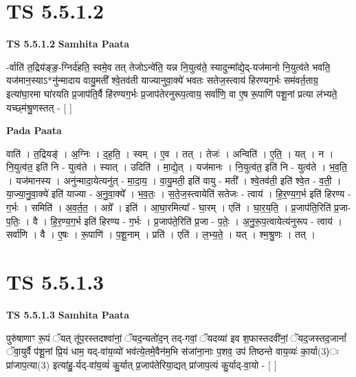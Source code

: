 \documentclass[17pt]{extarticle}
\begin{document}

\section{ TS 5.5.1.2 }

\textbf{TS 5.5.1.2 } \newline
\textbf{Samhita Paata} \newline

-र्वाति॑ त॒द्रिय॑ङ्ङ॒-ग्निर्द॑हति॒ स्वमे॒व तत् तेजोऽन्वे॑ति॒ यन्न नि॒युत्व॑ते॒ स्यादुन्मा᳚द्ये॒द्-यज॑मानो नि॒युत्व॑ते भवति॒ यज॑मान॒स्याऽ*नु॑न्मादाय वायु॒मती᳚ श्वे॒तव॑ती याज्यानुवा॒क्ये॑ भवतः सतेज॒स्त्वाय॑ हिरण्यग॒र्भः सम॑वर्त॒ताग्र॒ इत्या॑घा॒रमा घा॑रयति प्र॒जाप॑ति॒र्वै हि॑रण्यग॒र्भः प्र॒जाप॑तेरनुरूप॒त्वाय॒ सर्वा॑णि॒ वा ए॒ष रू॒पाणि॑ पशू॒नां प्रत्या ल॑भ्यते॒ यच्छ्म॑श्रु॒णस्तत् - [  ] \newline

\textbf{Pada Paata} \newline

वाति॑ । त॒द्रियङ्॑ । अ॒ग्निः । द॒ह॒ति॒ । स्वम् । ए॒व । तत् । तेजः॑ । अन्विति॑ । ए॒ति॒ । यत् । न । नि॒युत्व॑त॒ इति॑ नि - युत्व॑ते । स्यात् । उदिति॑ । मा॒द्ये॒त् । यज॑मानः । नि॒युत्व॑त॒ इति॑ नि - युत्व॑ते । भ॒व॒ति॒ । यज॑मानस्य । अनु॑न्मादा॒येत्यनु॑त् - मा॒दा॒य॒ । वा॒यु॒मती॒ इति॑ वायु - मती᳚ । श्वे॒तव॑ती॒ इति॑ श्वे॒त - व॒ती॒ । या॒ज्या॒नु॒वा॒क्ये॑ इति॑ याज्या - अ॒नु॒वा॒क्ये᳚ । भ॒व॒तः॒ । स॒ते॒ज॒स्त्वायेति॑ सतेजः - त्वाय॑ । हि॒र॒ण्य॒ग॒र्भ इति॑ हिरण्य - ग॒र्भः । समिति॑ । अ॒व॒र्त॒त॒ । अग्रे᳚ । इति॑ । आ॒घा॒रमित्या᳚ - घा॒रम् । एति॑ । घा॒र॒य॒ति॒ । प्र॒जाप॑ति॒रिति॑ प्र॒जा-प॒तिः॒ । वै । हि॒र॒ण्य॒ग॒र्भ इति॑ हिरण्य - ग॒र्भः । प्र॒जाप॑ते॒रिति॑ प्र॒जा - प॒तेः॒ । अ॒नु॒रू॒प॒त्वायेत्य॑नुरूप - त्वाय॑ । सर्वा॑णि । वै । ए॒षः । रू॒पाणि॑ । प॒शू॒नाम् । प्रति॑ । एति॑ । ल॒भ्य॒ते॒ । यत् । श्म॒श्रु॒णः । तत् ।  \newline





\section{ TS 5.5.1.3 }

\textbf{TS 5.5.1.3 } \newline
\textbf{Samhita Paata} \newline

पुरु॑षाणाꣳ रू॒पं ॅयत् तू॑प॒रस्तदश्वा॑नां॒ ॅयद॒न्यतो॑द॒न् तद्-गवां॒ ॅयदव्या॑ इव श॒फास्तदवी॑नां॒ ॅयद॒जस्तद॒जानां᳚ ॅवा॒युर्वै प॑शू॒नां प्रि॒यं धाम॒ यद्-वा॑य॒व्यो॑ भव॑त्ये॒तमे॒वैन॑म॒भि स॑जांना॒नाः प॒शव॒ उप॑ तिष्ठन्ते वाय॒व्यः॑ का॒र्या(3)ः प्रा॑जाप॒त्या(3) इत्या॑हु॒-र्यद्-वा॑य॒व्यं॑ कु॒र्यात् प्र॒जाप॑तेरिया॒द्यत् प्रा॑जाप॒त्यं कु॒र्याद्-वा॒यो - [  ] \newline
\end{document}
